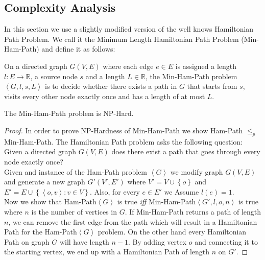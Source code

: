 \subsection{Complexity Analysis}

In this section we use a slightly modified version of the well knows Hamiltonian Path Problem. We call it the Minimum Length Hamiltonian Path Problem (Min-Ham-Path) and define it as follows:

\begin{definition}
On a directed graph $G(V,E)$ where each edge $e \in E$ is assigned a length $l: E \rightarrow \mathbb{R}$, a source node $s$ and a length $L \in \mathbb{R}$, the Min-Ham-Path problem $\left\langle G, l, s, L \right\rangle$ is to decide whether there exists a path in $G$ that starts from $s$, visits every other node exactly once and has a length of at most $L$.
\end{definition}

\begin{theorem}
\label{th:MinHam}
The Min-Ham-Path problem is NP-Hard.
\end{theorem}

\begin{proof}
In order to prove NP-Hardness of Min-Ham-Path we show Ham-Path $\leq_p$ Min-Ham-Path. The Hamiltonian Path problem asks the following question: Given a directed graph $G(V,E)$ does there exist a path that goes through every node exactly once?\\

Given and instance of the Ham-Path problem $\left\langle G \right\rangle$ we modify graph $G(V,E)$ and generate a new graph $G'(V', E')$ where $V' = V \cup \left\{ o \right\}$ and $E' = E \cup \left\{ \left\langle o, v \right\rangle : v \in V \right\}$. Also, for every $e \in E'$ we Assume $l(e) = 1$.\\

Now we show that Ham-Path$\left\langle G \right\rangle$ is true \emph{iff} Min-Ham-Path$\left\langle G', l, o, n \right\rangle$ is true where $n$ is the number of vertices in $G$. If Min-Ham-Path returns a path of length $n$, we can remove the first edge from the path which will result in a Hamiltonian Path for the Ham-Path$\left\langle G \right\rangle$ problem. On the other hand every Hamiltonian Path on graph $G$ will have length $n-1$. By adding vertex $o$ and connecting it to the starting vertex, we end up with a Hamiltonian Path of length $n$ on $G'$.
\end{proof}

